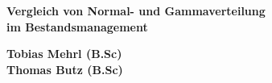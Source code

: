 \documentclass[12pt,a4paper, listof=entryprefix, bibliography=totocnumbered,toc=listofnumbered,footsepline]{scrartcl}
\newcounter{verzeichnis}
\begin{document}
\onehalfspacing	

\begin{center}

	\vspace*{4cm} %
	\Large
	\textbf{Vergleich von Normal- und Gammaverteilung}\\ %
	\large
	\textbf{im Bestandsmanagement}\\ %
		
	\vspace*{8cm} %
	\normalsize
	\begin{center}
	\date{\today}
	\textbf{Tobias Mehrl (B.Sc)}\\ %
	\textbf{Thomas Butz  (B.Sc)}
	\end{center}
\end{center}
\pagebreak

\singlespacing %
\setcounter{section}{0}
\setcounter{page}{1}

\tableofcontents %
\pagebreak

\onehalfspacing %
\renewcommand{\thesection}{\arabic{section}} %
\setcounter{page}{1}	%
\setcounter{section}{0}
\renewcommand{\sectionmark}[1]{\markright{#1}} %
\renewcommand{\subsectionmark}[1]{}            %
\renewcommand{\subsubsectionmark}[1]{}         %





\end{document}
